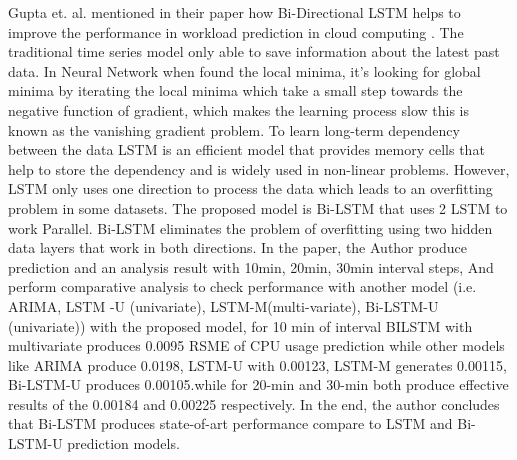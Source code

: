 Gupta et. al. mentioned in their paper how Bi-Directional LSTM helps to improve the performance in workload prediction in cloud computing \cite{gupta2017resource}. The traditional time series model only able to save information about the latest past data. In Neural Network when found the local minima, it’s looking for global minima by iterating the local minima which take a small step towards the negative function of gradient, which makes the learning process slow this is known as the vanishing gradient problem. To learn long-term dependency between the data LSTM is an efficient model that provides memory cells that help to store the dependency and is widely used in non-linear problems. However, LSTM only uses one direction to process the data which leads to an overfitting problem in some datasets. The proposed model is Bi-LSTM that uses 2 LSTM to work Parallel. Bi-LSTM eliminates the problem of overfitting using two hidden data layers that work in both directions. In the paper, the Author produce prediction and an analysis result with 10min, 20min, 30min interval steps, And perform comparative analysis to check performance with another model (i.e. ARIMA, LSTM -U (univariate), LSTM-M(multi-variate), Bi-LSTM-U (univariate)) with the proposed model, for 10 min of interval BILSTM with multivariate produces 0.0095 RSME of CPU usage prediction while other models like ARIMA produce 0.0198, LSTM-U with 0.00123, LSTM-M generates 0.00115, Bi-LSTM-U produces 0.00105.while for 20-min and
30-min both produce effective results of the 0.00184 and 0.00225 respectively. In the end, the author concludes that Bi-LSTM produces state-of-art performance compare to LSTM and Bi-LSTM-U prediction models.


